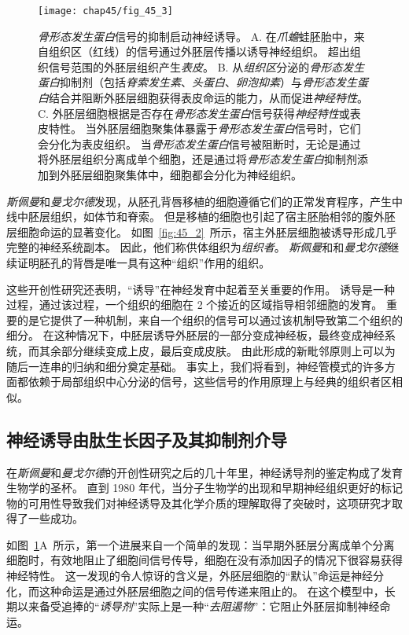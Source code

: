 \begin{figure}[htbp]
	\centering
	\texttt{[image: chap45/fig\_45\_3]}
	\caption{\textit{骨形态发生蛋白}信号的抑制启动神经诱导。
		A. 在\textit{爪蟾}蛙胚胎中，来自组织区（红线）的信号通过外胚层传播以诱导神经组织。
		超出组织信号范围的外胚层组织产生\textit{表皮}。
		B. 从\textit{组织区}分泌的\textit{骨形态发生蛋白}抑制剂（包括\textit{脊索发生素}、\textit{头蛋白}、\textit{卵泡抑素}）与\textit{骨形态发生蛋白}结合并阻断外胚层细胞获得表皮命运的能力，从而促进\textit{神经特性}。
		C. 外胚层细胞根据是否存在\textit{骨形态发生蛋白}信号获得\textit{神经特性}或表皮特性。
		当外胚层细胞聚集体暴露于\textit{骨形态发生蛋白}信号时，它们会分化为表皮组织。
		当\textit{骨形态发生蛋白}信号被阻断时，无论是通过将外胚层组织分离成单个细胞，还是通过将\textit{骨形态发生蛋白}抑制剂添加到外胚层细胞聚集体中，细胞都会分化为神经组织。}
	\label{fig:45_3}
\end{figure}


\textit{斯佩曼}和\textit{曼戈尔德}发现，从胚孔背唇移植的细胞遵循它们的正常发育程序，产生中线中胚层组织，如体节和脊索。
但是移植的细胞也引起了宿主胚胎相邻的腹外胚层细胞命运的显著变化。
如图~\ref{fig:45_2}~所示，宿主外胚层细胞被诱导形成几乎完整的神经系统副本。
因此，他们称供体组织为\textit{组织者}。
\textit{斯佩曼}和和\textit{曼戈尔德}继续证明胚孔的背唇是唯一具有这种“组织”作用的组织。


这些开创性研究还表明，“诱导”在神经发育中起着至关重要的作用。
诱导是一种过程，通过该过程，一个组织的细胞在 2 个接近的区域指导相邻细胞的发育。
重要的是它提供了一种机制，来自一个组织的信号可以通过该机制导致第二个组织的细分。
在这种情况下，中胚层诱导外胚层的一部分变成神经板，最终变成神经系统，而其余部分继续变成上皮，最后变成皮肤。
由此形成的新毗邻原则上可以为随后一连串的归纳和细分奠定基础。
事实上，我们将看到，神经管模式的许多方面都依赖于局部组织中心分泌的信号，这些信号的作用原理上与经典的组织者区相似。



\subsection{神经诱导由肽生长因子及其抑制剂介导}

在\textit{斯佩曼}和\textit{曼戈尔德}的开创性研究之后的几十年里，神经诱导剂的鉴定构成了发育生物学的圣杯。
直到 1980 年代，当分子生物学的出现和早期神经组织更好的标记物的可用性导致我们对神经诱导及其化学介质的理解取得了突破时，这项研究才取得了一些成功。


如图~\ref{fig:45_3}A~所示，第一个进展来自一个简单的发现：当早期外胚层分离成单个分离细胞时，有效地阻止了细胞间信号传导，细胞在没有添加因子的情况下很容易获得神经特性。
这一发现的令人惊讶的含义是，外胚层细胞的“默认”命运是神经分化，而这种命运是通过外胚层细胞之间的信号传递来阻止的。
在这个模型中，长期以来备受追捧的“\textit{诱导剂}”实际上是一种“\textit{去阻遏物}”：它阻止外胚层抑制神经命运。


